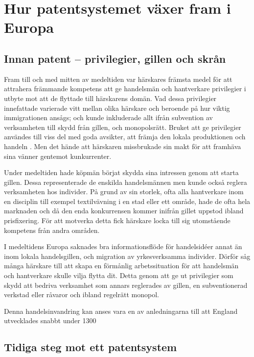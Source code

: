 \section{Hur patentsystemet växer fram i Europa}

\subsection{Innan patent -- privilegier, gillen och skrån} %
\label{sub:innan_patent_systemet}

Fram till och med mitten av medeltiden var härskares främsta medel för att
attrahera främmande kompetens att ge handelsmän och hantverkare privilegier i
utbyte mot att de flyttade till härskarens domän. 
Vad dessa privilegier innefattade varierade vitt mellan olika härskare och
beroende på hur viktig immigrationen ansågs; och kunde inkluderade allt ifrån
subvention av verksamheten till skydd från gillen, och monopolsrätt. 
Bruket att ge privilegier användes till viss del med goda avsikter, att främja
den lokala produktionen och handeln \cite{nard}. Men det hände att härskaren
missbrukade sin makt för att framhäva sina vänner gentemot kunkurrenter.

Under medeltiden hade köpmän börjat skydda sina intressen genom att starta
gillen. 
Dessa representerade de enskilda handelsmännen men kunde också reglera
verksamheten hos individer.
På grund av sin storlek, ofta alla hantverkare inom en disciplin till exempel
textilvävning i en stad eller ett område, hade de ofta hela marknaden och då
den enda konkurrensen kommer inifrån gillet uppstod ibland prisfixering. 
För att motverka detta fick härskare locka till sig utomstående kompetens från
andra områden.

I medeltidens Europa saknades bra informationsflöde för handelsidéer annat än
inom lokala handelsgillen, och migration av yrkesverksamma individer. 
Dörför såg många härskare till att skapa en förmånlig arbetssituation för att
handelsmän och hantverkare skulle vilja flytta dit. 
Detta genom att ge ut privilegier som skydd att bedriva verksamhet som annars
reglerades av gillen, en subventionerad verkstad eller råvaror och ibland
regelrätt monopol.

Denna handelsinvandring kan anses vara en av anledningarna till att England
utvecklades snabbt under 1300



\subsection{Tidiga steg mot ett patentsystem} 

